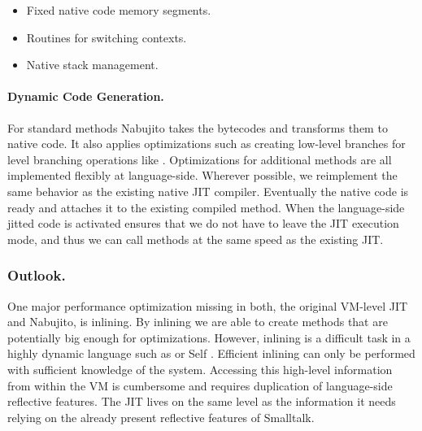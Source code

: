 \begin{itemize}
	\item Fixed native code memory segments.
	\item Routines for switching contexts.
	\item Native stack management.
\end{itemize}

\paragraph{Dynamic Code Generation.}
For standard methods Nabujito takes the bytecodes and transforms them to native code.
It also applies optimizations such as creating low-level branches for \ST level branching operations like .
Optimizations for additional methods are all implemented flexibly at language-side.
Wherever possible, we reimplement the same behavior as the existing native JIT compiler.
Eventually the native code is ready and \B attaches it to the existing compiled method.
When the language-side jitted code is activated \B ensures that we do not have to leave the JIT execution mode, and thus we can call methods at the same speed as the existing JIT.

\subsubsection{Outlook.}
One major performance optimization missing in both, the original \PH VM-level JIT and Nabujito, is inlining. 
By inlining we are able to create methods that are potentially big enough for optimizations.
However, inlining is a difficult task in a highly dynamic language such as \ST or Self \cite{Cham89a}. 
Efficient inlining can only be performed with sufficient knowledge of the system. 
Accessing this high-level information from within the VM is cumbersome and requires duplication of language-side reflective features.
The JIT lives on the same level as the information it needs relying on the already present reflective features of Smalltalk.


